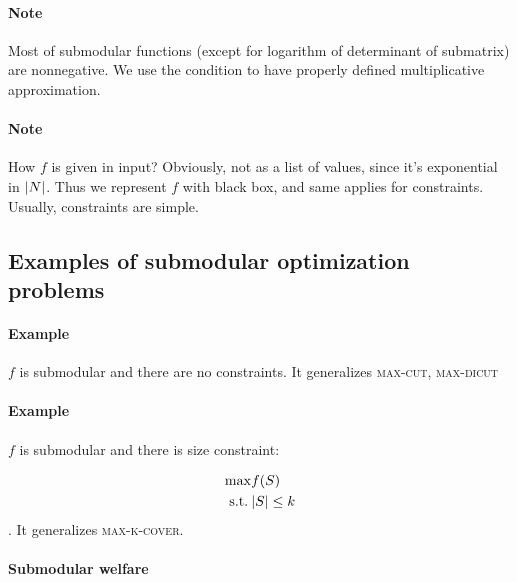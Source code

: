 \paragraph{Note} Most of submodular functions (except for logarithm of determinant of submatrix) are nonnegative. We use the condition to have properly defined multiplicative approximation.
\paragraph{Note} How $f$ is given in input? Obviously, not as a list of values, since it's exponential in $\abs{N}$. Thus we represent $f$ with black box, and same applies for constraints. Usually, constraints are simple. 

\subsection{Examples of submodular optimization problems}
\paragraph{Example}
$f$ is submodular and there are no constraints. It generalizes \textsc{max-cut}, \textsc{max-dicut}
\paragraph{Example}
$f$ is submodular and there is size constraint:

\begin{align}
\max & f(S)\\
\text{s.t.} \: & \abs{S} \leq k
\end{align}
. It generalizes \textsc{max-k-cover}.

\paragraph{Submodular welfare}
